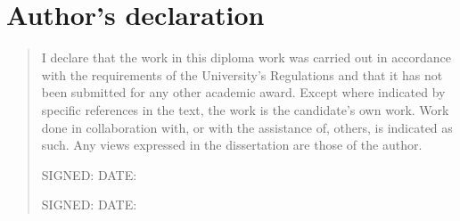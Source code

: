 %
%
\chapter{Author's declaration}
\begin{SingleSpace}
\begin{quote}
I declare that the work in this diploma work was carried out in accordance with the requirements of  the University's Regulations and that it  has not been submitted for any other academic award. Except where indicated by specific references in the text, the work is the candidate's own work. Work done in collaboration with, or with the assistance of, others, is indicated as such. Any views expressed in the dissertation are those of the author.

\vspace{1.5cm}
\noindent
\textsc{SIGNED:} \dotfill \hfill \textsc{DATE:} \dotfill

\vspace{1.5cm}
\noindent
\textsc{SIGNED:} \dotfill \hfill \textsc{DATE:} \dotfill
\end{quote}
\end{SingleSpace}
